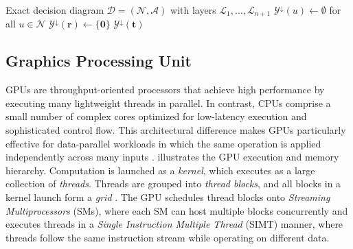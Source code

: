 \documentclass[letterpaper]{article}
\begin{document}
\begin{algorithm}[htbp]
\caption{Top-Down Pareto Frontier Enumeration}
\label{alg:top_down_pf}
\begin{algorithmic}[1]
\Require Exact decision diagram $\mathcal{D} = (\mathcal{N}, \mathcal{A})$ with layers $\mathcal{L}_1, \dots, \mathcal{L}_{n+1}$
\State $\mathcal{Y}^{\downarrow}(u) \gets \emptyset$ for all $u \in \mathcal{N}$
\State $\mathcal{Y}^{\downarrow}(\mathbf{r}) \gets \{\mathbf{0}\}$ 
    \State {}
\EndFor
\State \Return $\mathcal{Y}^{\downarrow}(\mathbf{t})$ 
\end{algorithmic}
\end{algorithm}


\subsection{Graphics Processing Unit}
\label{sec:prelim_gpu}

GPUs are throughput-oriented processors that achieve high performance by executing many lightweight threads in parallel. In contrast, CPUs comprise a small number of complex cores optimized for low-latency execution and sophisticated control flow. This architectural difference makes GPUs particularly effective for data-parallel workloads in which the same operation is applied independently across many inputs \cite{lindholm2008nvidia}.
 illustrates the GPU execution and memory hierarchy. Computation is launched as a \emph{kernel}, which executes as a large collection of \emph{threads}. Threads are grouped into \emph{thread blocks}, and all blocks in a kernel launch form a \emph{grid} \cite{nickolls2008scalable}. The GPU schedules thread blocks onto \emph{Streaming Multiprocessors} (SMs), where each SM can host multiple blocks concurrently and executes threads in a \emph{Single Instruction Multiple Thread} (SIMT) manner, where threads follow the same instruction stream while operating on different data.
\end{document}
